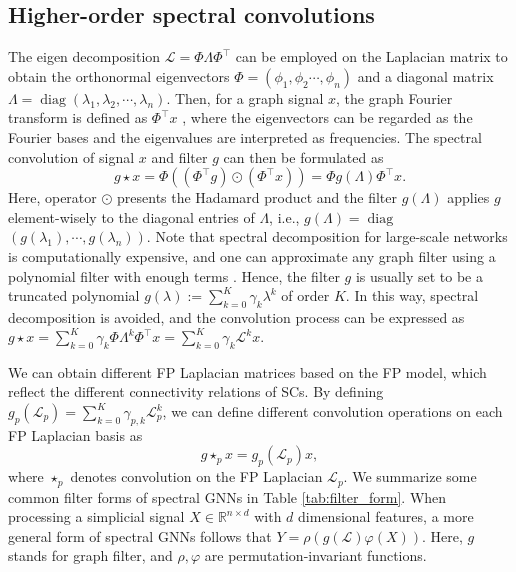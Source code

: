 \documentclass[letterpaper]{article} \usepackage{aaai24}
\theoremstyle{plain}
\theoremstyle{definition}
\theoremstyle{remark}
\begin{document}
\subsection{Higher-order spectral convolutions}

The eigen decomposition $\mathcal{L} =\Phi \Lambda \Phi^{\top}$ can be employed on the Laplacian matrix to obtain the orthonormal eigenvectors $\Phi=\left(\phi_{1}, \phi_{2} \cdots, \phi_{n}\right)$ and a diagonal matrix $\Lambda = \operatorname{diag}\left(\lambda_{1},\lambda_{2},\cdots,\lambda_{n}\right)$. 
Then, for a graph signal $x$, the graph Fourier transform is defined as $\Phi^{\top} x$ \cite{graphFourier2013}, where the eigenvectors can be regarded as the Fourier bases and the eigenvalues are interpreted as frequencies. The spectral convolution of signal $x$ and filter $g$ can then be formulated as
\begin{equation}
    g \star x =\Phi \left(\left( \Phi^{\top} g\right) \odot \left(\Phi^{\top} x\right)\right) =\Phi g(\Lambda) \Phi^{\top} x.
\end{equation}
Here, operator $\odot$ presents the Hadamard product and the filter $g(\Lambda)$ applies $g$ element-wisely to the diagonal entries of $\Lambda$, i.e., $g(\Lambda)= \operatorname{diag}$ $  \left(g(\lambda_1), \cdots, g(\lambda_n)\right)$.
Note that spectral decomposition for large-scale networks is computationally expensive,  and one can approximate any graph filter using a polynomial filter with enough terms \cite{graphFourier2013, BernNet}. 
Hence, the filter $g$ is usually set to be a truncated polynomial  $g (\lambda) := \sum_{k=0}^K \gamma_k \lambda^k$ of order $K$.
In this way, spectral decomposition is avoided, and the convolution process can be expressed as
$
     g \star x = 
     \sum_{k=0}^K \gamma_k \Phi  \Lambda^k \Phi^{\top} x = \sum_{k=0}^K \gamma_k \mathcal{L}^k x.
$


We can obtain different FP Laplacian matrices based on the FP model, which reflect the different connectivity relations of SCs. 
By defining $g_p(\mathcal{L}_p)=\sum_{k=0}^K \gamma_{p,k} \mathcal{L}_p^k$, we can define different convolution operations on each FP Laplacian basis as
\begin{equation}
    g \star_p x = g_p(\mathcal{L}_p)x,
\end{equation}
where $\star_p$ denotes convolution on the FP Laplacian $\mathcal{L}_p$.
We summarize some common filter forms of spectral GNNs in Table \ref{tab:filter_form}.
When processing a simplicial signal $X\in\mathbb{R}^{n\times d}$ with $d$ dimensional features, a more general form of spectral GNNs follows that 
$Y = \rho \left( g(\mathcal{L})\varphi(X)\right)$.
Here, $g$ stands for graph filter, and $\rho, \varphi$ are permutation-invariant functions. 
\end{document}
